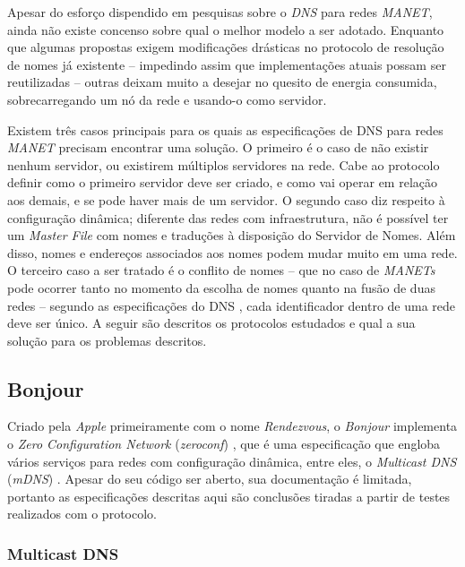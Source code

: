 
Apesar do esforço dispendido em pesquisas sobre o \textit{DNS} para redes 
\textit{MANET}, ainda não existe concenso sobre qual o melhor modelo a ser 
adotado. Enquanto que algumas propostas exigem modificações drásticas no 
protocolo de resolução de nomes já existente -- impedindo assim que 
implementações atuais possam ser reutilizadas -- outras deixam muito a desejar 
no quesito de energia consumida, sobrecarregando um nó da rede e usando-o como
 servidor.

Existem três casos principais para os quais as especificações de DNS para redes 
\textit{MANET} precisam encontrar uma solução. O primeiro é o caso de não existir 
nenhum servidor, ou existirem múltiplos servidores na rede. Cabe ao protocolo 
definir como o primeiro servidor deve ser criado, e como vai operar em relação 
aos demais, e se pode haver mais de um servidor. O segundo caso diz respeito à 
configuração dinâmica; diferente das redes com infraestrutura, não é possível 
ter um \textit{Master File} com nomes e traduções à disposição do Servidor de 
Nomes. Além disso, nomes e endereços associados aos nomes podem mudar muito em 
uma rede. O terceiro caso a ser tratado é o conflito de nomes -- que no caso de 
\textit{MANETs} pode ocorrer tanto no momento da escolha de nomes quanto na fusão
 de duas redes -- segundo as especificações do DNS \cite{rfc1035}, cada 
 identificador dentro de uma rede deve ser único. A seguir são descritos os 
 protocolos estudados e qual a sua solução para os problemas descritos.

\subsection{Bonjour}
\label{Bonjour}

    Criado pela \textit{Apple} primeiramente com o nome \textit{Rendezvous}, o 
    \textit{Bonjour} implementa o \textit{Zero Configuration Network} 
    (\textit{zeroconf}) \cite{zeroconf}, que é uma especificação que engloba vários
    serviços para redes com configuração dinâmica, entre eles, o 
    \textit{Multicast DNS} (\textit{mDNS}) \cite{mdns}. Apesar do seu código ser 
    aberto, sua documentação é limitada, portanto as especificações descritas aqui
    são conclusões tiradas a partir de testes realizados com o protocolo.
  
    \subsubsection{Multicast DNS}
    \label{MDNS}
  
